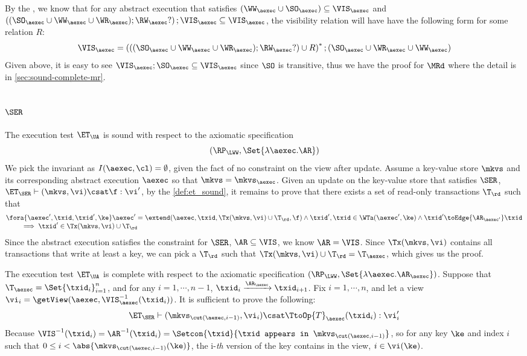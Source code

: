 By the \cite{cerone:snapshot}, we know that for any abstract execution that satisfies \( (\WW_\aexec \cup \SO_\aexec) \subseteq \VIS_\aexec \)
and \( \left( (\SO_\aexec \cup \WW_\aexec \cup \WR_\aexec ) ; \RW_{\aexec}? \right) ; \VIS_\aexec \subseteq \VIS_\aexec \),
the visibility relation will have have the following form for some relation \( R \):
\[
    \VIS_\aexec = \left( \left( (\SO_\aexec \cup \WW_\aexec \cup \WR_\aexec ) ; \RW_{\aexec}? \right)  \cup R \right)^* ; (\SO_\aexec \cup \WR_\aexec \cup \WW_\aexec) 
\]
Given above, it is easy to see \( \VIS_\aexec ; \SO_\aexec \subseteq \VIS_\aexec \) since \( \SO \) is transitive, 
thus we have the proof for \( \MRd \) where the detail is in \cref{sec:sound-complete-mr}.


\subsection{ \( \SER \)}

The execution test $\ET_\UA$ is sound with respect to the axiomatic specification 
\[ 
    (\RP_{\LWW}, \Set{\lambda \aexec. \AR })
\]
We pick the invariant as \( I( \aexec, \cl ) = \emptyset \), given the fact of no constraint on the view after update.
Assume a key-value store \( \mkvs \) and its corresponding abstract execution \( \aexec \) so that \( \mkvs = \mkvs_\aexec \).
Given an update on the key-value store that satisfies \( \SER \), \ie \(\ET_\SER \vdash (\mkvs, \vi) \csat \f : \vi' \),
by the \cref{def:et_sound}, it remains to prove that there exists a set of read-only transactions \( \T_\rd \) such that
\[
    \begin{array}{@{}l@{}}
        \fora{ \aexec', \txid, \txid', \ke } 
        \aexec' = \extend(\aexec, \txid, \Tx(\mkvs, \vi) \cup \T_\rd, \f ) 
        \land \txid', \txid \in \WTa(\aexec', \ke) \land  \txid' \toEdge{\AR_{\aexec'}} \txid  \\
        \qquad {} \implies \txid' \in \Tx(\mkvs, \vi) \cup \T_\rd
    \end{array}
\]
Since the abstract execution satisfies the constraint for \( \SER \), \ie \( \AR \subseteq \VIS \), we know \( \AR = \VIS \).
Since \( \Tx(\mkvs, \vi)  \) contains all transactions that write at least a key, 
we can pick a \( \T_\rd \) such that \( \Tx(\mkvs, \vi) \cup \T_\rd = \T_\aexec\),
which gives us the proof.

The execution test $\ET_\UA$ is complete with respect to the axiomatic specification \( (\RP_{\LWW}, \Set{\lambda \aexec. \AR_\aexec }) \).
Suppose that $\T_{\aexec} = \Set{\txid_{i}}_{i=1}^{n}$, and for any $i=1,\cdots, n-1$,
$\txid_{i} \xrightarrow{\AR_{\aexec}} \txid_{i+1}$.
Fix $i=1,\cdots,n$, and let a view $\vi_{i} = \getView(\aexec, \VIS^{-1}_{\aexec}(\txid_{i}))$.
It is sufficient to prove the following:
\[
    \ET_\SER \vdash ( \mkvs_{\cut(\aexec, i-1)}, \vi_i ) \csat \TtoOp{T}_{\aexec}(\txid_{i}) : \vi'_{i}
\]
Because \( \VIS^{-1}(\txid_i) = \AR^{-1}(\txid_i) = \Setcon{\txid }{\txid \texttt{ appears in } \mkvs_{\cut(\aexec, i-1)} }\),
so for any key \( \ke \) and index \( i \) such that \( 0 \leq i < \abs{\mkvs_{\cut(\aexec, i-1)}(\ke)} \),
the i-\emph{th} version of the key contains in the view, \ie \( i \in \vi(\ke)\).

